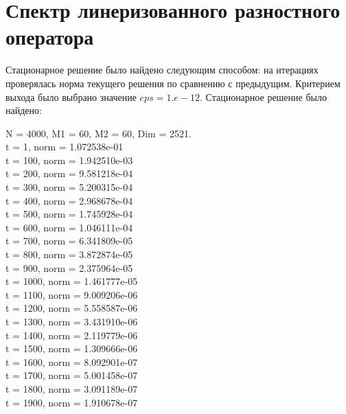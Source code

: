\documentclass[12pt,a4paper]{article}
\begin{document}
\section{Спектр линеризованного разностного оператора}
Стационарное решение было найдено следующим способом: на итерациях проверялась норма текущего решения по сравнению с предыдущим. Критерием выхода было выбрано значение $eps = 1.e-12$. Стационарное решение было найдено:
\begin{center}
N = 4000, M1 =  60, M2 =  60, Dim =   2521.                 \\
t =    1, norm = 1.072538e-01                               \\
t =  100, norm = 1.942510e-03                               \\
t =  200, norm = 9.581218e-04                               \\
t =  300, norm = 5.200315e-04                               \\
t =  400, norm = 2.968678e-04                               \\
t =  500, norm = 1.745928e-04                               \\
t =  600, norm = 1.046111e-04                               \\
t =  700, norm = 6.341809e-05                               \\
t =  800, norm = 3.872874e-05                               \\
t =  900, norm = 2.375964e-05                               \\
t = 1000, norm = 1.461777e-05                               \\
t = 1100, norm = 9.009206e-06                               \\
t = 1200, norm = 5.558587e-06                               \\
t = 1300, norm = 3.431910e-06                               \\
t = 1400, norm = 2.119779e-06                               \\
t = 1500, norm = 1.309666e-06                               \\
t = 1600, norm = 8.092901e-07                               \\
t = 1700, norm = 5.001458e-07                               \\
t = 1800, norm = 3.091189e-07                               \\
t = 1900, norm = 1.910678e-07                               \\

\end{center}
\end{document}
